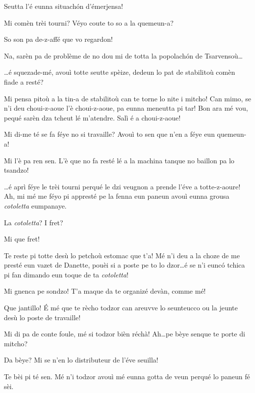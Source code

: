 \begin{drama}
\Seunteuccospeaks{} Seutta l’é eunna situach\'on d’émerjensa!

\Diegospeaks Mi comèn trèi tourni? Véyo coute to so a la quemeun-a?

\Seunteuccospeaks So son pa de-z-affé que vo regardon!

\Diegospeaks Na, sarèn pa de problème de no dou mi de totta la popolach\'on de Tsarvensoù\ldots

\Attilaspeaks \ldots é squezade-mé, avouì totte seutte spèize, dedeun lo pat de stabilitoù comèn fiade a resté?

\Seunteuccospeaks Mi pensa pitoù a la tin-a de stabilitoù can te torne lo nite i mitcho! Can mimo, se n'i deu choui-z-aoue l'è choui-z-aoue, pa eunna meneutta pi tar! Bon ara mé vou, pequé sarèn dza tcheut lé m’atendre. Salì é a choui-z-aoue! 


\Attilaspeaks Mi di-me té se fa féye no si travaille? Avouì to sen que n'en a féye eun quemeun-a!

\Diegospeaks Mi l'è pa ren sen. L'è que no fa resté lé a la machina tanque no baillon pa lo tsandzo!

\Attilaspeaks \ldots é aprì féye le trèi tourni perqué le dzi veugnon a prende l'éve a totte-z-aoure! Ah, mi mé me féyo pi appresté pe la fenna eun paneun avouì eunna grousa \textit{cotoletta} eumpanaye.

\Diegospeaks La \textit{cotoletta}? I fret?

\Attilaspeaks Mi que fret!

\Diegospeaks Te reste pi totte desù lo  petchoù estomac  que t'a! Mé n'i deu a la choze de me presté eun vazet de Danette, pouèi si a poste pe to lo dzor\ldots é se n'i eunc\'o tchica pi fan dimando eun toque de ta \textit{cotoletta}!

\Attilaspeaks Mi  gnenca pe sondzo! T'a maque da te organizé devàn, comme mé!

\Diegospeaks Que jantillo! \'E mé que te rècho todzor can areuvve lo seunteucco ou la jeunte desù lo poste de travaille! 

\Attilaspeaks Mi di pa de conte foule, mé si todzor bièn réchà! Ah\ldots pe bèye senque te porte di mitcho?

\Diegospeaks Da bèye? Mi se n'en lo distributeur de l'éve seuilla!

\Attilaspeaks Te bèi pi té sen. Mé n'i todzor avouì mé eunna gotta de veun  perqué lo paneun fé sèi.


\end{drama}
